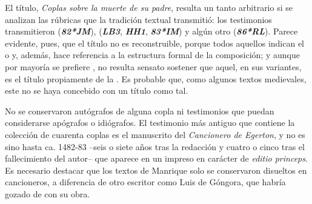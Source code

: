 \documentclass[11pt,twoside]{article}
\newcommand{\eg}{{\emph{\textbf{LB3}}}}
\newcommand{\jm}{\emph{\textbf{82*JM}}}
\newcommand{\rl}{\emph{\textbf{86*RL}}}
\newcommand{\hh}{\emph{\textbf{HH1}}}
\newcommand{\im}{\emph{\textbf{83*IM}}}
\begin{document}
%
El título, \emph{Coplas sobre la muerte de su padre}, resulta un tanto arbitrario si se analizan las rúbricas que la tradición textual transmitió: los testimonios transmitieron  (\jm),  (\eg, \hh, \im) y algún otro  (\rl). Parece evidente, pues, que el título no es reconstruible, porque todos aquellos indican el  o  y, además, hace referencia a la estructura formal de la composición; y aunque por mayoría se prefiere , no resulta sensato sostener que aquel, en sus variantes, es el título propiamente de la . Es probable que, como algunos textos medievales, este no se haya concebido con un título como tal.\par
%
No se conservaron autógrafos de alguna copla ni testimonios que puedan considerarse apógrafos o idiógrafos. El testimonio más antiguo que contiene la colección de cuarenta coplas es el manuscrito del \emph{Cancionero de Egerton}, y no es sino hasta ca. 1482-83 --seis o siete años tras la redacción y cuatro o cinco tras el fallecimiento del autor-- que aparece en un impreso en carácter de \emph{editio princeps}. Es necesario destacar que los textos de Manrique solo se conservaron disueltos en cancioneros, a diferencia de otro escritor como Luis de Góngora, que habría gozado de  con su obra.\par
%
\end{document}

